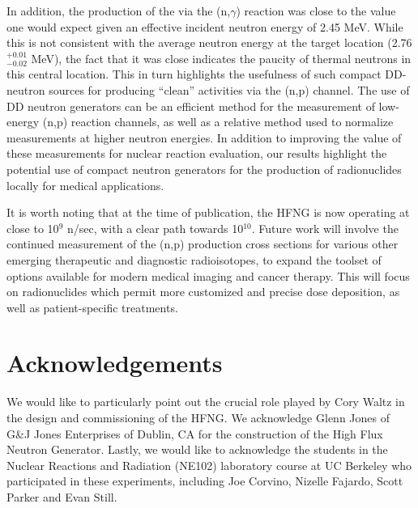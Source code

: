 \documentclass[5p]{elsarticle}
\newcommand{\comment}[1]{\todo[color=blue!20!white,inline]{ASV: #1}}
\begin{document}
 In addition, the   production of the   via the (n,$\gamma$) reaction was close to the value one would expect given an effective incident neutron energy of 2.45 MeV.  
 While this is not consistent with the average neutron energy at the target location (2.76$^{+0.01}_{-0.02}$ MeV), the fact that it was close indicates the paucity of thermal neutrons in this central location.  
 This in turn highlights the usefulness of such compact DD-neutron sources  for producing \enquote{clean} activities via the (n,p) channel.  
The use of DD neutron generators can be an efficient method for the measurement of low-energy (n,p) reaction channels, as well as a relative method used to normalize measurements at higher neutron energies.
 In addition to improving the value of these measurements for nuclear reaction evaluation, our results highlight the potential use of compact neutron generators for the production of radionuclides locally for medical applications.


 It is worth noting that at the time of publication, the  HFNG is now operating at close to 10$^9$ n/sec, with
a clear path towards 10$^{10}$.
 Future work will involve the continued measurement of the (n,p) production cross sections for various other emerging therapeutic and diagnostic radioisotopes, to expand the toolset of options available for modern medical imaging and cancer therapy.
This will focus on radionuclides which permit more customized and precise dose deposition, as well as patient-specific treatments.
 


 
 \section{Acknowledgements}
 
 We would like to particularly point out the crucial role played by Cory Waltz in the design and commissioning of the HFNG.
 We acknowledge Glenn Jones of G\&J Jones Enterprises of Dublin, CA for the construction  of the High Flux Neutron Generator. 
 Lastly, we would like to acknowledge the students in the Nuclear Reactions and Radiation (NE102) laboratory course at UC Berkeley who participated in these experiments, including Joe Corvino, Nizelle Fajardo, Scott Parker and Evan Still.  
 
\end{document}
